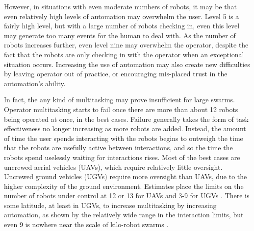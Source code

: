 \documentclass[]{article}
\begin{document}
However, in situations with even moderate numbers of robots, it may be that even relatively high levels of automation may overwhelm the user. 
Level 5 is a fairly high level, but with a large number of robots checking in, even this level may generate too many events for the human to deal with. 
As the number of robots increases further, even level nine may overwhelm the operator, despite the fact that the robots are only checking in with the operator when an exceptional situation occurs. 
Increasing the use of automation may also create new difficulties by leaving operator out of practice, or encouraging mis-placed trust in the automation's ability. 

In fact, the any kind of multitasking may prove insufficient for large swarms. 
Operator multitasking starts to fail once there are more than about 12 robots being operated at once, in the best cases.
Failure generally takes the form of task effectiveness no longer increasing as more robots are added.
Instead, the amount of time the user spends interacting with the robots begins to outweigh the time that the robots are usefully active between interactions, and so the time the robots spend uselessly waiting for interactions rises. 
Most of the best cases are uncrewed aerial vehicles (UAVs), which require relatively little oversight. 
Uncrewed ground vehicles (UGVs) require more oversight than UAVs, due to the higher complexity of the ground environment. 
Estimates place the limits on the number of robots under control at 12 or 13 for UAVs and 3-9 for UGVs \cite{WangSearchScale}.  
There is some latitude, at least in UGVs, to increase multitasking by increasing automation, as shown by the relatively wide range in the interaction limits, but even 9 is nowhere near the scale of kilo-robot swarms \cite{Olsen:2004:FMH:985692.985722}.
\end{document}
